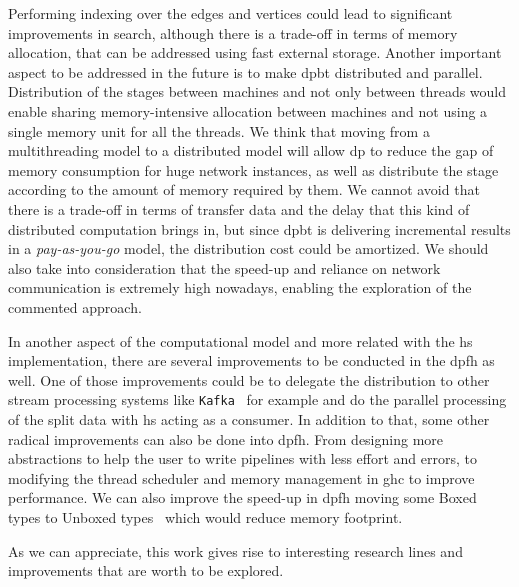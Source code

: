 Performing indexing over the edges and vertices could lead to significant improvements in search, although there is a trade-off in terms of memory allocation, that can be addressed using fast external storage.
Another important aspect to be addressed in the future is to make \acrlong{dpbt} distributed and parallel. Distribution of the stages between machines and not only between threads would enable sharing memory-intensive allocation between machines and not using a single memory unit for all the threads.
We think that moving from a multithreading model to a distributed model will allow \acrlong{dp} to reduce the gap of memory consumption for huge network instances, as well as distribute the stage according to the amount of memory required by them. 
We cannot avoid that there is a trade-off in terms of transfer data and the delay that this kind of distributed computation brings in, but since \acrlong{dpbt} is delivering incremental results in a \emph{pay-as-you-go} model, the distribution cost could be amortized. 
We should also take into consideration that the speed-up and reliance on network communication is extremely high nowadays, enabling the exploration of the commented approach.

In another aspect of the computational model and more related with the \acrlong{hs} implementation, there are several improvements to be conducted in the \acrlong{dpfh} as well. 
One of those improvements could be to delegate the distribution to other stream processing systems like \texttt{Kafka}~\cite{kafka} for example and do the parallel processing of the split data with \acrlong{hs} acting as a consumer.
In addition to that, some other radical improvements can also be done into \acrlong{dpfh}. From designing more abstractions to help the user to write pipelines with less effort and errors, to modifying the thread scheduler and memory management in \acrshort{ghc} to improve performance. 
We can also improve the speed-up in \acrlong{dpfh} moving some Boxed types to Unboxed types~\cite{hs-unbox} which would reduce memory footprint.

As we can appreciate, this work gives rise to interesting research lines and improvements that are worth to be explored.

